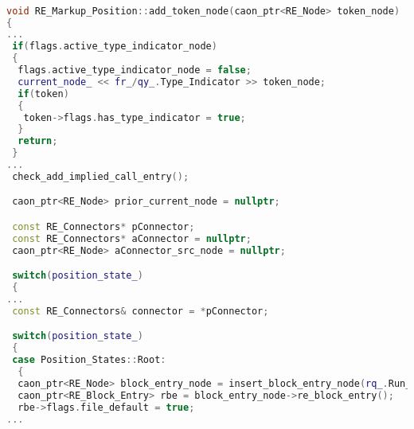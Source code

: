 \begin{lstlisting}[language = C++, numbers = none, 
caption={Hypergraph Modification Code},label={lst:figAddToken}, 
    basicstyle = \ttfamily\bfseries\tiny, linewidth = .95\linewidth] 

void RE_Markup_Position::add_token_node(caon_ptr<RE_Node> token_node)
{
...
 if(flags.active_type_indicator_node)
 {
  flags.active_type_indicator_node = false;
  current_node_ << fr_/qy_.Type_Indicator >> token_node;
  if(token)
  {
   token->flags.has_type_indicator = true;
  }
  return;
 }
...
 check_add_implied_call_entry();

 caon_ptr<RE_Node> prior_current_node = nullptr;

 const RE_Connectors* pConnector;
 const RE_Connectors* aConnector = nullptr;
 caon_ptr<RE_Node> aConnector_src_node = nullptr;

 switch(position_state_)
 {
... 
 const RE_Connectors& connector = *pConnector;

 switch(position_state_)
 {
 case Position_States::Root:
  {
  caon_ptr<RE_Node> block_entry_node = insert_block_entry_node(rq_.Run_Block_Entry);
  caon_ptr<RE_Block_Entry> rbe = block_entry_node->re_block_entry();
  rbe->flags.file_default = true;
...
\end{lstlisting}
